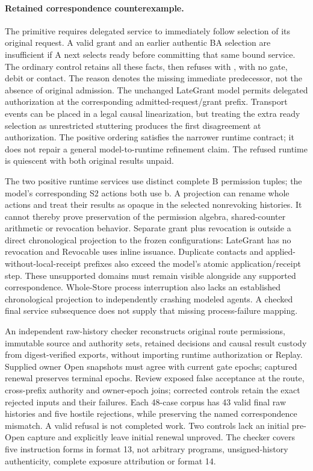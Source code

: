 \documentclass[11pt,a4paper]{article}
\theoremstyle{definition}
\theoremstyle{remark}
\begin{document}
\paragraph{Retained correspondence counterexample.} The primitive requires delegated service to immediately follow selection of its original request. A valid grant and an earlier authentic BA selection are insufficient if A next selects ready before committing that same bound service. The ordinary control retains all these facts, then refuses with , with no gate, debit or contact. The reason denotes the missing immediate predecessor, not the absence of original admission. The unchanged LateGrant model permits delegated authorization at the corresponding admitted-request/grant prefix. Transport events can be placed in a legal causal linearization, but treating the extra ready selection as unrestricted stuttering produces the first disagreement at authorization. The positive ordering satisfies the narrower runtime contract; it does not repair a general model-to-runtime refinement claim. The refused runtime is quiescent with both original results unpaid.

The two positive runtime services use distinct complete B permission tuples; the model's corresponding S2 actions both use b. A projection can rename whole actions and treat their results as opaque in the selected nonrevoking histories. It cannot thereby prove preservation of the permission algebra, shared-counter arithmetic or revocation behavior. Separate grant plus revocation is outside a direct chronological projection to the frozen configurations: LateGrant has no revocation and Revocable uses inline issuance. Duplicate contacts and applied-without-local-receipt prefixes also exceed the model's atomic application/receipt step. These unsupported domains must remain visible alongside any supported correspondence. Whole-Store process interruption also lacks an established chronological projection to independently crashing modeled agents. A checked final service subsequence does not supply that missing process-failure mapping.

An independent raw-history checker reconstructs original route permissions, immutable source and authority sets, retained decisions and causal result custody from digest-verified exports, without importing runtime authorization or Replay. Supplied owner Open snapshots must agree with current gate epochs; captured renewal preserves terminal epochs. Review exposed false acceptance at the route, cross-prefix authority and owner-epoch joins; corrected controls retain the exact rejected inputs and their failures. Each 48-case corpus has 43 valid final raw histories and five hostile rejections, while preserving the named correspondence mismatch. A valid refusal is not completed work. Two controls lack an initial pre-Open capture and explicitly leave initial renewal unproved. The checker covers five instruction forms in format 13, not arbitrary programs, unsigned-history authenticity, complete exposure attribution or format 14.
\end{document}
